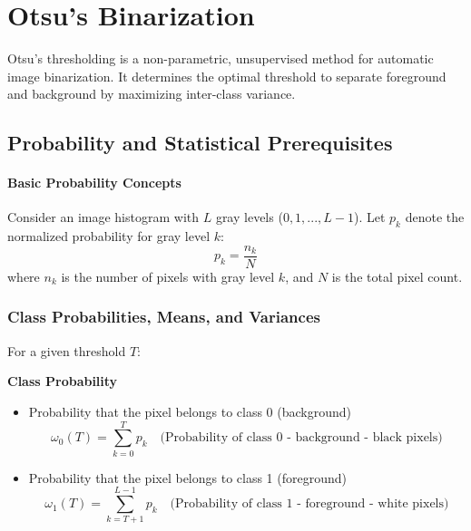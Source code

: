 \section{Otsu's Binarization}

Otsu’s thresholding is a non-parametric, unsupervised method for automatic image binarization. It determines the optimal threshold to separate foreground and background by maximizing inter-class variance.

\subsection{Probability and Statistical Prerequisites}

\paragraph{Basic Probability Concepts}
Consider an image histogram with $L$ gray levels ($0, 1, ..., L-1$). Let $p_k$ denote the normalized probability for gray level $k$:
$$
p_k = \frac{n_k}{N}
$$
where $n_k$ is the number of pixels with gray level $k$, and $N$ is the total pixel count.

\subsubsection{Class Probabilities, Means, and Variances}
For a given threshold $T$:

\noindent \textbf{Class Probability}
\begin{itemize}
\item Probability that the pixel belongs to class 0 (background)
\[
\omega_0(T) = \sum_{k=0}^T p _k \quad\text{(Probability of class 0 - background - black pixels)}
\]
\item Probability that the pixel belongs to class 1 (foreground)
\[\omega_1(T) = \sum_{k=T+1}^{L-1} p_k \quad\text{(Probability of class 1 - foreground - white pixels)} 
\]
\end{itemize}

